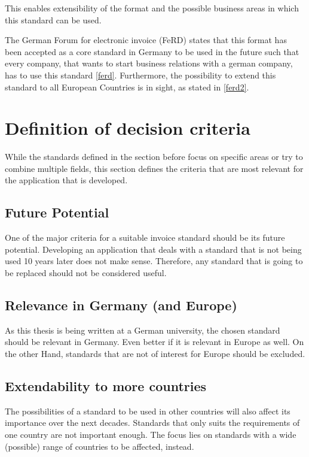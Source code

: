 \documentclass[english,mt]{lmedoc}
\begin{document}
This enables extensibility of the format and the possible business areas in which this standard can be used.

The German Forum for electronic invoice (FeRD) states that this format has been accepted as a core standard in Germany to be used in the future such that every company, that wants to start business relations with a german company, has to use this standard \ref{ferd}. Furthermore, the possibility to extend this standard to all European Countries is in sight, as stated in \ref{ferd2}.

\section{Definition of decision criteria}
\label{sec2.2}

While the standards defined in the section before focus on specific areas or try to combine multiple fields, this section defines the criteria that are most relevant for the application that is developed.

\subsection{Future Potential}
\label{sec2.2.1}
One of the major criteria for a suitable invoice standard should be its future potential. Developing an application that deals with a standard that is not being used 10 years later does not make sense. Therefore, any standard that is going to be replaced should not be considered useful.

\subsection{Relevance in Germany (and Europe)}
\label{sec2.2.2}
As this thesis is being written at a German university, the chosen standard should be relevant in Germany. Even better if it is relevant in Europe as well. On the other Hand, standards that are not of interest for Europe should be excluded.

\subsection{Extendability to more countries}
\label{sec2.2.3}
The possibilities of a standard to be used in other countries will also affect its importance over the next decades. Standards that only suits the requirements of one country are not important enough. The focus lies on standards with a wide (possible) range of countries to be affected, instead.
\end{document}

